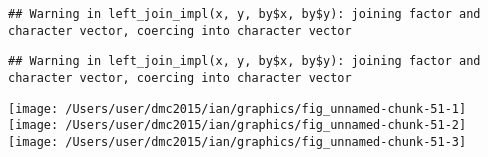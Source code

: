 \documentclass[10pt]{report}
\newenvironment{Shaded}{}{}
\newcommand{\KeywordTok}[1]{\textcolor[rgb]{0.00,0.44,0.13}{\textbf{{#1}}}}
\newcommand{\DataTypeTok}[1]{\textcolor[rgb]{0.56,0.13,0.00}{{#1}}}
\newcommand{\StringTok}[1]{\textcolor[rgb]{0.25,0.44,0.63}{{#1}}}
\newcommand{\NormalTok}[1]{{#1}}
\begin{document}
\begin{verbatim}
## Warning in left_join_impl(x, y, by$x, by$y): joining factor and character vector, coercing into character vector
\end{verbatim}

\begin{Shaded}
\end{Shaded}

\begin{verbatim}
## Warning in left_join_impl(x, y, by$x, by$y): joining factor and character vector, coercing into character vector
\end{verbatim}

\begin{Shaded}
\end{Shaded}

\begin{center}\texttt{[image: /Users/user/dmc2015/ian/graphics/fig\_unnamed-chunk-51-1]} \texttt{[image: /Users/user/dmc2015/ian/graphics/fig\_unnamed-chunk-51-2]} \texttt{[image: /Users/user/dmc2015/ian/graphics/fig\_unnamed-chunk-51-3]} \end{center}
\end{document}
